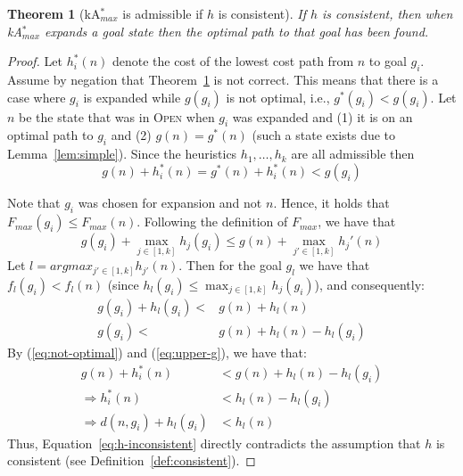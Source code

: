 \documentclass{aicom2e}
\newtheorem{theorem}{Theorem}
\newcommand{\kastarmax}{kA$^*_{max}$}
\newcommand{\open}{\textsc{Open}}
\begin{document}
\begin{theorem}[\kastarmax{} is admissible if $h$ is consistent]
    If $h$ is consistent, then when
    \kastarmax{} expands a goal state then the optimal path to that goal has been found.
    \label{the:max-f}
\end{theorem}
\begin{proof}
    Let $h^*_i(n)$ denote the cost of the lowest cost path from $n$ to goal $g_i$.
    Assume by negation that Theorem~\ref{the:max-f} is not correct. This means that
    there is a case where $g_i$ is expanded while $g(g_i)$ is not optimal,
    i.e., $g^*(g_i)<g(g_i)$. Let $n$ be the state
    that was in \open{}  when $g_i$ was expanded
    and (1) it is on an optimal path to $g_i$
    and (2) $g(n)=g^*(n)$ (such a state exists due to Lemma~\ref{lem:simple}). Since the heuristics $h_1,\ldots, h_k$ are all admissible
    then
    \begin{equation}
    g(n)+h_i^*(n) = g^*(n)+h_i^*(n) < g(g_i)
    \label{eq:not-optimal}
    \end{equation}

    Note that $g_i$ was chosen for expansion and not $n$. Hence, it holds that $ F_{max}(g_i) \leq F_{max}(n) $.
    Following the definition of $F_{max}$, we have that
    \begin{equation}
    g(g_i) + \max_{j\in [1,k]} h_{j}(g_i) \leq g(n)+\max_{j'\in [1,k]} h_j'(n)
    \end{equation}
    Let $l=argmax_{j'\in [1,k]} h_{j'}(n)$.
    Then for the goal $g_l$ we have that
    $f_l(g_i) < f_l(n)$ (since $h_l(g_i) \leq \max_{j\in [1,k]} h_{j}(g_i)$), and consequently:
    \begin{align}
    g(g_i)+h_l(g_i) < & g(n)+h_l(n) \\
    g(g_i) < & g(n)+h_l(n) - h_l(g_i) \label{eq:upper-g}
    \end{align}
    By (\ref{eq:not-optimal}) and (\ref{eq:upper-g}), we have that:
    \begin{align}
    g(n)+h^*_i(n)  & < g(n)+h_l(n) - h_l(g_i)\\
    \Rightarrow h^*_i(n)  & < h_l(n) - h_l(g_i)\\
    \Rightarrow d(n,g_i) + h_l(g_i) & < h_l(n) \label{eq:h-inconsistent}
    \end{align}
    Thus, Equation~\ref{eq:h-inconsistent} directly contradicts the assumption
    that $h$ is consistent (see Definition~\ref{def:consistent}).
\end{proof}
\end{document}
